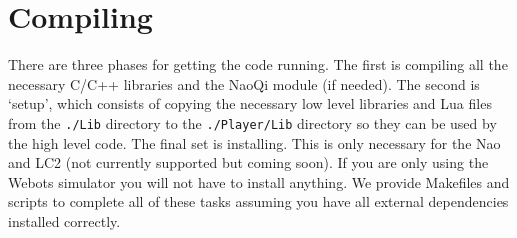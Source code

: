 \documentclass{article}
\begin{document}
\section{Compiling}

  There are three phases for getting the code running. The first is compiling all the necessary C/C++ libraries and the NaoQi module (if needed). The second is `setup', which consists of copying the necessary low level libraries and Lua files from the \texttt{./Lib} directory to the \texttt{./Player/Lib} directory so they can be used by the high level code. The final set is installing. This is only necessary for the Nao and LC2 (not currently supported but coming soon). If you are only using the Webots simulator you will not have to install anything. We provide Makefiles and scripts to complete all of these tasks assuming you have all external dependencies installed correctly.
\end{document}
